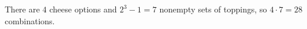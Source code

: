 There are $4$ cheese options and $2^3-1=7$ nonempty sets of toppings, so $4\cdot7=\boxed{28}$ combinations.
